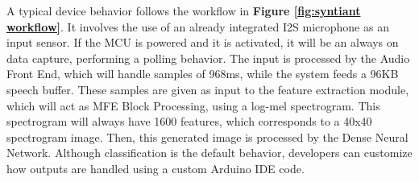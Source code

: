 \newline A typical device behavior follows the workflow in \textbf{Figure \ref{fig:syntiant workflow}}. It involves the use of an already integrated I2S microphone as an input sensor. If the MCU is powered and it is activated, it will be an always on data capture, performing a polling behavior. The input is processed by the Audio Front End, which will handle samples of 968ms, while the system feeds a 96KB speech buffer\cite{tinyML_2021_summit}. These samples are given as input to the feature extraction module, which will act as MFE Block Processing\cite{syntiant_audio_block}, using a log-mel spectrogram. This spectrogram will always have 1600 features, which corresponds to a 40x40 spectrogram image. Then, this generated image is processed by the Dense Neural Network. Although classification is the default behavior, developers can customize how outputs are handled using a custom Arduino IDE code\cite{origin_code_1}.
